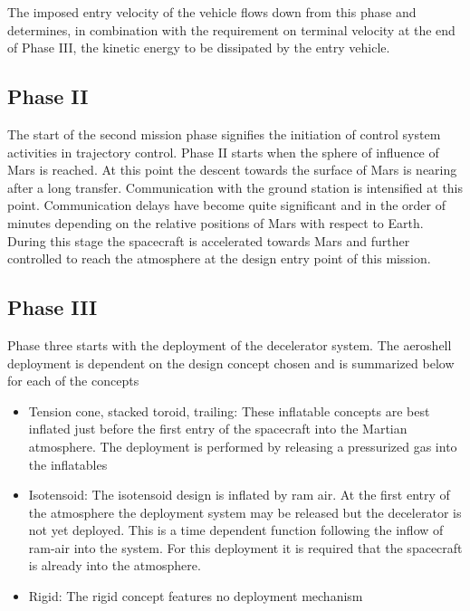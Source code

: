 The imposed entry velocity of the vehicle flows down from this phase and determines, in combination with the requirement on terminal velocity at the end of Phase III, the kinetic energy to be dissipated by the entry vehicle.

\subsection{Phase II}\label{sec:p2}
The start of the second mission phase signifies the initiation of control system activities in trajectory control. Phase II starts when the sphere of influence of Mars is reached.  At this point the descent towards the surface of Mars is nearing after a long transfer. Communication  with the ground station is intensified at this point. Communication delays have become quite significant and in the order of minutes depending on the relative positions of Mars with respect to Earth.  
During this stage the spacecraft is accelerated towards Mars and further controlled to reach the atmosphere at the design entry point of this mission.


\subsection{Phase III}\label{sec:p3}

Phase three starts with the deployment of the decelerator system. The aeroshell deployment is dependent on the design concept chosen and is summarized below for each of the concepts 

\begin{itemize}
\item Tension cone, stacked toroid, trailing: These inflatable concepts are best inflated just before the first entry of the spacecraft into the Martian atmosphere. The deployment is performed by releasing a pressurized gas into the inflatables
\item Isotensoid: The isotensoid design is inflated by ram air. At the first entry of the atmosphere the deployment system may be released but the decelerator is not yet deployed. This is a time dependent function following the inflow of ram-air into the system. For this deployment it is required that the spacecraft is already into the atmosphere.
\item Rigid: The rigid concept features no deployment mechanism
\end{itemize}

